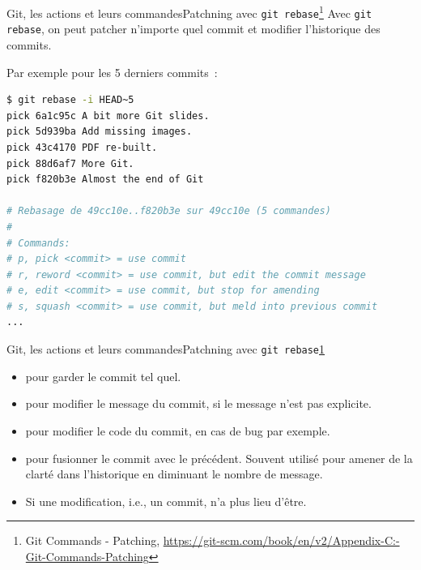 \documentclass{beamer}
\begin{document}
    \begin{frame}[fragile]{Git, les actions et leurs commandes}{Patchning avec \lstinline{git rebase}\footnote{\label{progitpatching}Git Commands - Patching, \url{https://git-scm.com/book/en/v2/Appendix-C:-Git-Commands-Patching}}}
        \transdissolve
        Avec \lstinline{git rebase}, on peut patcher n'importe quel commit et modifier l'historique des commits.

        Par exemple pour les 5 derniers commits~:
        \begin{lstlisting}[language=sh]
$ git rebase -i HEAD~5
pick 6a1c95c A bit more Git slides.
pick 5d939ba Add missing images.
pick 43c4170 PDF re-built.
pick 88d6af7 More Git.
pick f820b3e Almost the end of Git

# Rebasage de 49cc10e..f820b3e sur 49cc10e (5 commandes)
#
# Commands:
# p, pick <commit> = use commit
# r, reword <commit> = use commit, but edit the commit message
# e, edit <commit> = use commit, but stop for amending
# s, squash <commit> = use commit, but meld into previous commit
...
        \end{lstlisting}
    \end{frame}

    \begin{frame}{Git, les actions et leurs commandes}{Patchning avec \lstinline{git rebase}\cref{progitpatching}}
        \transdissolve
        \begin{itemize}
            \item {} pour garder le commit tel quel.
            \item {} pour modifier le message du commit, si le message n'est pas explicite.
            \item {} pour modifier le code du commit, en cas de bug par exemple.
            \item {} pour fusionner le commit avec le précédent.
            Souvent utilisé pour amener de la clarté dans l'historique en diminuant le nombre de message.
            \item {} Si une modification, i.e., un commit, n'a plus lieu d'être.
        \end{itemize}
    \end{frame}
\end{document}
